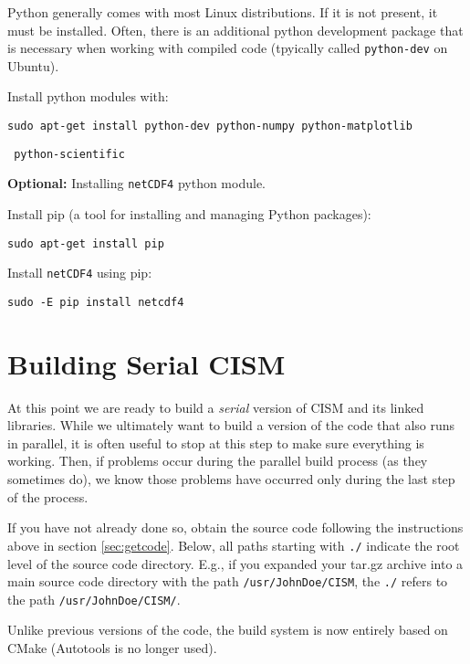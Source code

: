 \begin{mdframed}[style=ubuntu] %
Python generally comes with most Linux distributions.  If it is not present, it must be installed.
Often, there is an additional python development package that is necessary
when working with compiled code (tpyically called \texttt{python-dev} on Ubuntu).

Install python modules with:

\texttt{sudo apt-get install python-dev python-numpy python-matplotlib} 

\texttt{          python-scientific}

\textbf{Optional:} Installing \texttt{netCDF4} python module.

\noindent
Install pip (a tool for installing and managing Python packages):

\texttt{sudo apt-get install pip}

\noindent
Install \texttt{netCDF4} using pip:

\texttt{sudo -E pip install netcdf4}
\end{mdframed}                 %



\section{Building Serial CISM}
\label{serial-build}
At this point we are ready to build a \textit{serial} version of CISM and its linked libraries. While we ultimately want to build a 
version of the code that also runs in parallel, it is often useful to stop at this step to make sure everything is working. Then, if 
problems occur during the parallel build process (as they sometimes do), we know those problems have occurred only during 
the last step of the process.

If you have not already done so, obtain the source code following the instructions above in section \ref{sec:getcode}. Below, all 
paths starting with \texttt{./} indicate the root level of the source code directory. E.g., if you expanded your tar.gz archive into a main source code 
directory with the path \texttt{/usr/JohnDoe/CISM}, the \texttt{./} refers to the path \texttt{/usr/JohnDoe/CISM/}.  

Unlike previous versions of the code, the build system is now entirely based on CMake 
(Autotools is no longer used). 


